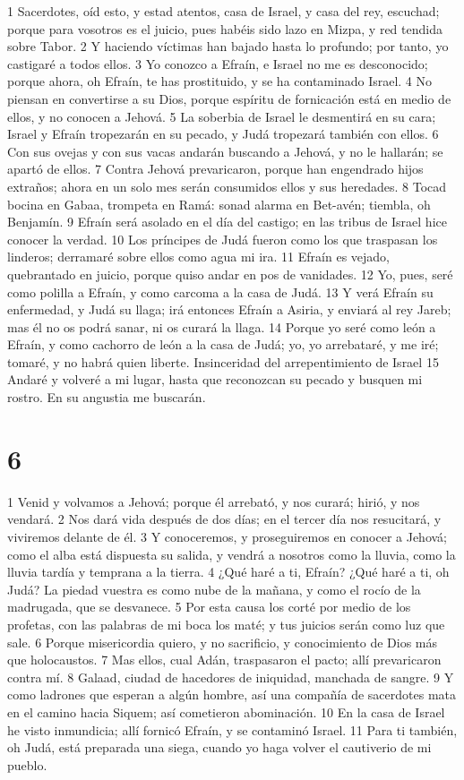 1 Sacerdotes, oíd esto, y estad atentos, casa de Israel, y casa del rey, escuchad; porque para vosotros es el juicio, pues habéis sido lazo en Mizpa, y red tendida sobre Tabor.
2 Y haciendo víctimas han bajado hasta lo profundo; por tanto, yo castigaré a todos ellos.
3 Yo conozco a Efraín, e Israel no me es desconocido; porque ahora, oh Efraín, te has prostituido, y se ha contaminado Israel.
4 No piensan en convertirse a su Dios, porque espíritu de fornicación está en medio de ellos, y no conocen a Jehová.
5 La soberbia de Israel le desmentirá en su cara; Israel y Efraín tropezarán en su pecado, y Judá tropezará también con ellos.
6 Con sus ovejas y con sus vacas andarán buscando a Jehová, y no le hallarán; se apartó de ellos.
7 Contra Jehová prevaricaron, porque han engendrado hijos extraños; ahora en un solo mes serán consumidos ellos y sus heredades.
8 Tocad bocina en Gabaa, trompeta en Ramá: sonad alarma en Bet-avén; tiembla, oh Benjamín.
9 Efraín será asolado en el día del castigo; en las tribus de Israel hice conocer la verdad.
10 Los príncipes de Judá fueron como los que traspasan los linderos; derramaré sobre ellos como agua mi ira.
11 Efraín es vejado, quebrantado en juicio, porque quiso andar en pos de vanidades.
12 Yo, pues, seré como polilla a Efraín, y como carcoma a la casa de Judá.
13 Y verá Efraín su enfermedad, y Judá su llaga; irá entonces Efraín a Asiria, y enviará al rey Jareb; mas él no os podrá sanar, ni os curará la llaga.
14 Porque yo seré como león a Efraín, y como cachorro de león a la casa de Judá; yo, yo arrebataré, y me iré; tomaré, y no habrá quien liberte.
Insinceridad del arrepentimiento de Israel
15 Andaré y volveré a mi lugar, hasta que reconozcan su pecado y busquen mi rostro. En su angustia me buscarán.

\chapter{6}

1 Venid y volvamos a Jehová; porque él arrebató, y nos curará; hirió, y nos vendará.
2 Nos dará vida después de dos días; en el tercer día nos resucitará, y viviremos delante de él.
3 Y conoceremos, y proseguiremos en conocer a Jehová; como el alba está dispuesta su salida, y vendrá a nosotros como la lluvia, como la lluvia tardía y temprana a la tierra.
4 ¿Qué haré a ti, Efraín? ¿Qué haré a ti, oh Judá? La piedad vuestra es como nube de la mañana, y como el rocío de la madrugada, que se desvanece.
5 Por esta causa los corté por medio de los profetas, con las palabras de mi boca los maté; y tus juicios serán como luz que sale.
6 Porque misericordia quiero, y no sacrificio, y conocimiento de Dios más que holocaustos.
7 Mas ellos, cual Adán, traspasaron el pacto; allí prevaricaron contra mí.
8 Galaad, ciudad de hacedores de iniquidad, manchada de sangre.
9 Y como ladrones que esperan a algún hombre, así una compañía de sacerdotes mata en el camino hacia Siquem; así cometieron abominación.
10 En la casa de Israel he visto inmundicia; allí fornicó Efraín, y se contaminó Israel.
11 Para ti también, oh Judá, está preparada una siega, cuando yo haga volver el cautiverio de mi pueblo.


